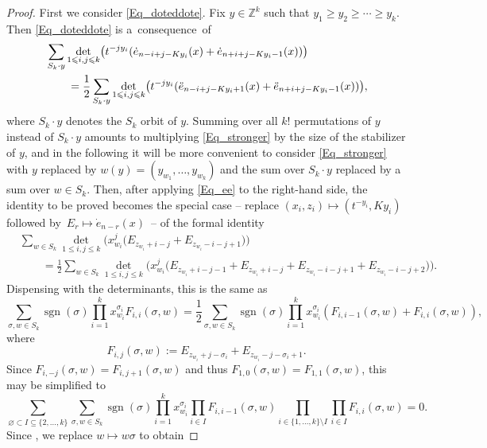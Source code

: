 \documentclass[pdftex]{sigma}
\numberwithin{equation}{section}
\renewcommand{\leq}{\leqslant}
\renewcommand{\geq}{\geqslant}
\DeclareMathOperator{\sgn}{sgn}
\begin{document}
\begin{proof}
First we consider \eqref{Eq_doteddote}.
Fix $y\in\mathbb{Z}^k$ such that $y_1\geq y_2\geq\cdots\geq y_k$.
Then \eqref{Eq_doteddote} is a~consequence~of
\begin{align}
&\sum_{S_k\cdot y} \det_{1\leq i,j\leq k}\bigl( t^{-jy_i}
 (\dot{e}_{n-i+j-Ky_i}(x)+\dot{e}_{n+i+j-Ky_i-1}(x) )\bigr) \notag \\
&\qquad=\frac{1}{2}\sum_{S_k\cdot y} \det_{1\leq i,j\leq k}\bigl(
t^{-jy_i}
 (\ddot{e}_{n-i+j-Ky_i+1}(x)+\ddot{e}_{n+i+j-Ky_i-1}(x) )\bigr),
\label{Eq_stronger}
\end{align}
where $S_k\cdot y$ denotes the $S_k$ orbit of $y$.
Summing over all $k!$ permutations of $y$ instead of $S_k\cdot y$
amounts to multiplying \eqref{Eq_stronger} by the size of
the stabilizer of $y$, and in the following it will
be more convenient to consider \eqref{Eq_stronger} with $y$ replaced by
$w(y)=(y_{w_1},\dots,y_{w_k})$ and the sum over $S_k\cdot y$ replaced
by a sum over $w\in S_k$.
Then, after applying \eqref{Eq_ee} to the right-hand side, the identity
to be proved becomes the special case --
replace $(x_i,z_i)\mapsto (t^{-y_i},Ky_i)$ followed
by~${E_r\mapsto \dot{e}_{n-r}(x)}$~-- of the formal identity
\begin{align*}
&\sum_{w\in S_k} \det_{1\leq i,j\leq k}\bigl(x_{w_i}^j
\bigl(E_{z_{w_i}+i-j}+E_{z_{w_i}-i-j+1}\bigr)\bigr) \\
&\qquad{}=\frac{1}{2}\sum_{w\in S_k}
\det_{1\leq i,j\leq k}\bigl(
x_{w_i}^j \bigl(E_{z_{w_i}+i-j-1}+E_{z_{w_i}+i-j}+
E_{z_{w_i}-i-j+1}+E_{z_{w_i}-i-j+2}\bigr)\bigr).
\end{align*}
Dispensing with the determinants, this is the same as
\[
\sum_{\sigma,w\in S_k}\sgn(\sigma)\prod_{i=1}^k
x_{w_i}^{\sigma_i} F_{i,i}(\sigma,w)
=\frac{1}{2}\sum_{\sigma,w\in S_k}\sgn(\sigma)\prod_{i=1}^k
x_{w_i}^{\sigma_i} (F_{i,i-1}(\sigma,w)+F_{i,i}(\sigma,w) ),
\]
where
\[
F_{i,j}(\sigma,w):=E_{z_{w_i}+j-\sigma_i}+E_{z_{w_i}-j-\sigma_i+1}.
\]
Since $F_{i,-j}(\sigma,w)=F_{i,j+1}(\sigma,w)$ and thus
$F_{1,0}(\sigma,w)=F_{1,1}(\sigma,w)$, this may be simplified to
\begin{equation}\label{Eq_setsum}
\sum_{\varnothing\subset I\subseteq\{2,\dots,k\}}
\sum_{\sigma,w\in S_k}\sgn(\sigma)
\prod_{i=1}^k x_{w_i}^{\sigma_i}
\prod_{i\in I} F_{i,i-1}(\sigma,w)
\prod_{i\in\{1,\dots,k\}\setminus I}
\prod_{i\in I} F_{i,i}(\sigma,w)=0.
\end{equation}
Since ,
we replace $w\mapsto w\sigma$ to obtain

\end{proof}
\end{document}
